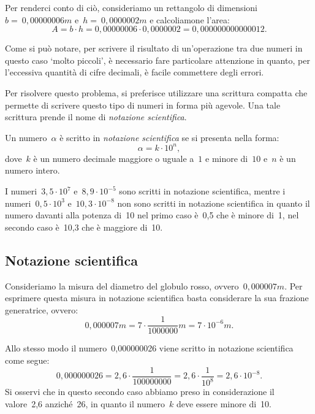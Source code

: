Per renderci conto di ciò, consideriamo un rettangolo di dimensioni
$b =~0,00000006\unit{m}$ e~$h =~0,0000002\unit{m}$ e calcoliamone l'area:
\[A=b\cdot h=0,00000006\cdot0,0000002=0,000000000000012.\]

\begin{center}

\end{center}

Come si può notare, per scrivere il risultato di un'operazione tra due 
numeri 
in questo caso `molto piccoli', è necessario fare particolare attenzione in 
quanto, per l'eccessiva quantità di cifre decimali, è facile commettere 
degli 
errori.

Per risolvere questo problema, si preferisce utilizzare una scrittura 
compatta 
che permette di scrivere questo tipo di numeri in forma più agevole.
Una tale scrittura prende il nome di \emph{notazione scientifica}.

\begin{definizione}
Un numero~$\alpha$ è scritto in \emph{notazione scientifica} se
si presenta nella forma:
\[\alpha=k\cdot10^n,\] 
dove~$k$ è un numero decimale maggiore o uguale a~$1$ e minore di~$10$ 
e~$n$ 
è un numero intero.
\end{definizione}

\begin{exrig}
 \begin{esempio}
I numeri~$3,5\cdot10^7$ e~$8,9\cdot10^{-5}$ sono scritti in notazione 
scientifica, mentre i numeri~$0,5\cdot10^3$ e~$10,3\cdot 10^{-8}$ non sono 
scritti in notazione scientifica in quanto il numero davanti alla potenza 
di~10 nel primo caso è~0,5 che è minore di~1, nel secondo caso è~10,3 che è 
maggiore di~10.
 \end{esempio}
\end{exrig}

\subsection{Notazione scientifica}
Consideriamo la misura del diametro del globulo rosso, 
ovvero~$0,000007\unit{m}$.
Per esprimere questa misura in notazione scientifica basta considerare la 
sua 
frazione generatrice, ovvero:
\[0,000007\unit{m}=7\cdot\frac{1}{1000000}\unit{m}=7\cdot10^{-6}\unit{m}.\]

Allo stesso modo il numero~0,000000026 viene scritto in notazione 
scientifica 
come segue:
\[0,000000026=2,6\cdot\frac{1}{100000000}=2,6\cdot\frac{1}{10^8}=2,6\cdot10^
{-8}.\]
Si osservi che in questo secondo caso abbiamo preso in considerazione il 
valore~2,6 anziché~26, in quanto il numero~$k$ deve essere minore di~10.


